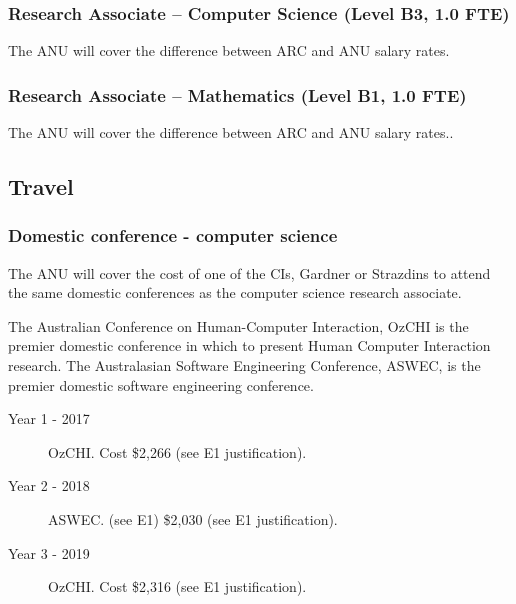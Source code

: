 \documentclass[a4paper,fontsize=12pt]{scrartcl}
\begin{document}
\subsubsection*{Research Associate – Computer Science (Level B3, 1.0 FTE)}

The ANU will cover the difference between ARC and ANU salary rates.


\subsubsection*{Research Associate – Mathematics (Level B1, 1.0 FTE)}

The ANU will cover the difference between ARC and ANU salary rates..





\subsection*{Travel}

\subsubsection*{Domestic conference - computer science}

The ANU will cover the cost of one of the CIs, Gardner or Strazdins 
to attend the  same domestic conferences as the computer science 
research associate. 

The Australian Conference on Human-Computer Interaction, OzCHI 
is the premier domestic conference in which to present 
Human Computer Interaction research. 
The Australasian Software Engineering Conference, ASWEC, 
is the premier domestic software engineering conference.

\begin{description}
\item[Year 1 - 2017] OzCHI. Cost \$2,266  (see E1 justification).

\item[Year 2 - 2018] ASWEC. (see E1) \$2,030  (see E1 justification).

\item[Year 3 -  2019] OzCHI.  Cost \$2,316 (see E1 justification).

\end{description}
\end{document}
